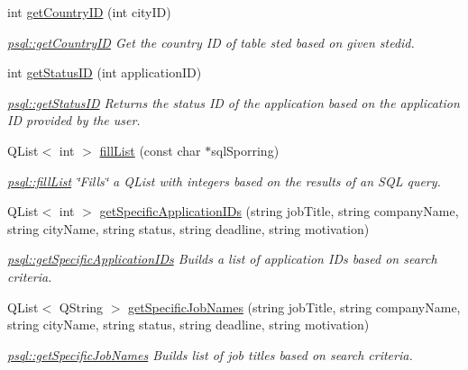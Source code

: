 \begin{DoxyCompactItemize}
int \hyperlink{classpsql_a81d02dc0350ba11d90257914078ba432}{get\+Country\+ID} (int city\+ID)
\begin{DoxyCompactList}\small\item\em \hyperlink{classpsql_a81d02dc0350ba11d90257914078ba432}{psql\+::get\+Country\+ID} Get the country ID of table sted based on given stedid. \end{DoxyCompactList}\item 
int \hyperlink{classpsql_a9c02c92c09cb60c35d24375673b7df06}{get\+Status\+ID} (int application\+ID)
\begin{DoxyCompactList}\small\item\em \hyperlink{classpsql_a9c02c92c09cb60c35d24375673b7df06}{psql\+::get\+Status\+ID} Returns the status ID of the application based on the application ID provided by the user. \end{DoxyCompactList}\item 
Q\+List$<$ int $>$ \hyperlink{classpsql_a9a3082a159c962dfcd84e23930f5619b}{fill\+List} (const char $\ast$sql\+Sporring)
\begin{DoxyCompactList}\small\item\em \hyperlink{classpsql_a9a3082a159c962dfcd84e23930f5619b}{psql\+::fill\+List} \char`\"{}\+Fills\char`\"{} a Q\+List with integers based on the results of an S\+QL query. \end{DoxyCompactList}\item 
Q\+List$<$ int $>$ \hyperlink{classpsql_ab6edb8a2e42d8ac7c4ae29f5b0cb494f}{get\+Specific\+Application\+I\+Ds} (string job\+Title, string company\+Name, string city\+Name, string status, string deadline, string motivation)
\begin{DoxyCompactList}\small\item\em \hyperlink{classpsql_ab6edb8a2e42d8ac7c4ae29f5b0cb494f}{psql\+::get\+Specific\+Application\+I\+Ds} Builds a list of application I\+Ds based on search criteria. \end{DoxyCompactList}\item 
Q\+List$<$ Q\+String $>$ \hyperlink{classpsql_a029f2ef38c4156cc6c67765900c8245f}{get\+Specific\+Job\+Names} (string job\+Title, string company\+Name, string city\+Name, string status, string deadline, string motivation)
\begin{DoxyCompactList}\small\item\em \hyperlink{classpsql_a029f2ef38c4156cc6c67765900c8245f}{psql\+::get\+Specific\+Job\+Names} Builds list of job titles based on search criteria. \end{DoxyCompactList}\item 

\end{DoxyCompactItemize}
